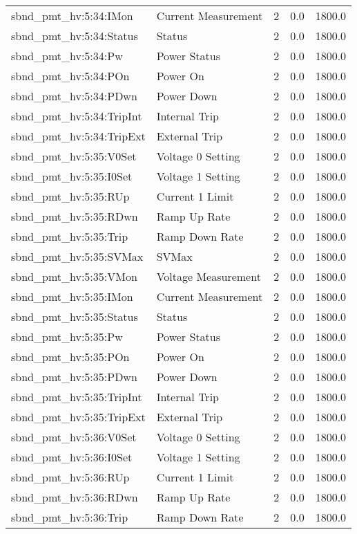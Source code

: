\begin{center}
\begin{longtable}{l | l l l l }
sbnd\_pmt\_hv:5:34:IMon & Current Measurement & 2 & 0.0 & 1800.0\\ 
sbnd\_pmt\_hv:5:34:Status & Status & 2 & 0.0 & 1800.0\\ 
sbnd\_pmt\_hv:5:34:Pw & Power Status & 2 & 0.0 & 1800.0\\ 
sbnd\_pmt\_hv:5:34:POn & Power On & 2 & 0.0 & 1800.0\\ 
sbnd\_pmt\_hv:5:34:PDwn & Power Down & 2 & 0.0 & 1800.0\\ 
sbnd\_pmt\_hv:5:34:TripInt & Internal Trip & 2 & 0.0 & 1800.0\\ 
sbnd\_pmt\_hv:5:34:TripExt & External Trip & 2 & 0.0 & 1800.0\\ 
sbnd\_pmt\_hv:5:35:V0Set & Voltage 0 Setting & 2 & 0.0 & 1800.0\\ 
sbnd\_pmt\_hv:5:35:I0Set & Voltage 1 Setting & 2 & 0.0 & 1800.0\\ 
sbnd\_pmt\_hv:5:35:RUp & Current 1 Limit & 2 & 0.0 & 1800.0\\ 
sbnd\_pmt\_hv:5:35:RDwn & Ramp Up Rate & 2 & 0.0 & 1800.0\\ 
sbnd\_pmt\_hv:5:35:Trip & Ramp Down Rate & 2 & 0.0 & 1800.0\\ 
sbnd\_pmt\_hv:5:35:SVMax & SVMax & 2 & 0.0 & 1800.0\\ 
sbnd\_pmt\_hv:5:35:VMon & Voltage Measurement & 2 & 0.0 & 1800.0\\ 
sbnd\_pmt\_hv:5:35:IMon & Current Measurement & 2 & 0.0 & 1800.0\\ 
sbnd\_pmt\_hv:5:35:Status & Status & 2 & 0.0 & 1800.0\\ 
sbnd\_pmt\_hv:5:35:Pw & Power Status & 2 & 0.0 & 1800.0\\ 
sbnd\_pmt\_hv:5:35:POn & Power On & 2 & 0.0 & 1800.0\\ 
sbnd\_pmt\_hv:5:35:PDwn & Power Down & 2 & 0.0 & 1800.0\\ 
sbnd\_pmt\_hv:5:35:TripInt & Internal Trip & 2 & 0.0 & 1800.0\\ 
sbnd\_pmt\_hv:5:35:TripExt & External Trip & 2 & 0.0 & 1800.0\\ 
sbnd\_pmt\_hv:5:36:V0Set & Voltage 0 Setting & 2 & 0.0 & 1800.0\\ 
sbnd\_pmt\_hv:5:36:I0Set & Voltage 1 Setting & 2 & 0.0 & 1800.0\\ 
sbnd\_pmt\_hv:5:36:RUp & Current 1 Limit & 2 & 0.0 & 1800.0\\ 
sbnd\_pmt\_hv:5:36:RDwn & Ramp Up Rate & 2 & 0.0 & 1800.0\\ 
sbnd\_pmt\_hv:5:36:Trip & Ramp Down Rate & 2 & 0.0 & 1800.0\\ 

\end{longtable}
\end{center}
